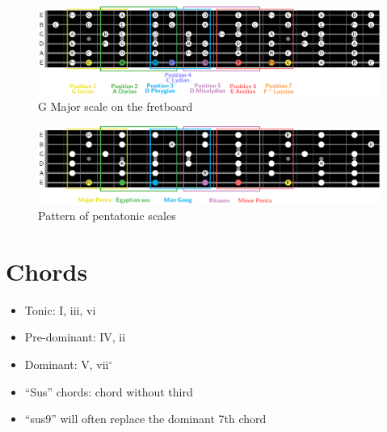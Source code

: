 \documentclass{article}
\begin{document}
\begin{figure}[h!]
	\centering
	\hspace*{-2cm}
	\includegraphics[scale=0.55, trim= {0cm 0cm 0cm 0cm}, clip]{Fretboard_MajorScale/main.pdf}
	\caption{G Major scale on the fretboard}
	\label{fig}
\end{figure}

\begin{figure}[h!]
	\centering
	\hspace*{-2cm}
	\includegraphics[scale=0.55, trim= {0cm 0cm 0cm 0cm}, clip]{Fretboard_pentatonic/main.pdf}
	\caption{Pattern of pentatonic scales}
	\label{fig}
\end{figure}

\newpage
\section{Chords}

\begin{itemize}
	\item Tonic: I, iii, vi 
	\item Pre-dominant: IV, ii
	\item Dominant: V, vii$^\circ$
\end{itemize}


\begin{itemize}
	\item ``Sus'' chords: chord without third
	\item ``sus9'' will often replace the dominant 7th chord
\end{itemize}

\newpage
\end{document}
